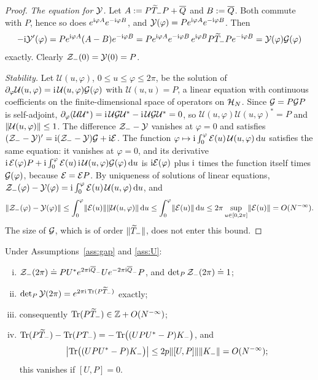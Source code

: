 \begin{proof}
\emph{The equation for $\mathcal{Y}$.} Let $A:=P\widetilde{T}_{-} P+\overline{Q}$ and $B:=\overline{Q}$. Both commute with $P$, hence so does
$e^{\mathrm{i}\varphi A}e^{-\mathrm{i}\varphi B}$, and $\mathcal{Y}(\varphi)=Pe^{\mathrm{i}\varphi A}e^{-\mathrm{i}\varphi B}$. Then
\[
-\mathrm{i}\mathcal{Y}'(\varphi)=Pe^{\mathrm{i}\varphi A}(A-B)e^{-\mathrm{i}\varphi B}=Pe^{\mathrm{i}\varphi A}e^{-\mathrm{i}\varphi B}\,e^{\mathrm{i}\varphi B}P\widetilde{T}_{-} Pe^{-\mathrm{i}\varphi B}
=\mathcal{Y}(\varphi)\mathcal{G}(\varphi)
\]
exactly. Clearly $\mathcal{Z}_{-}(0)=\mathcal{Y}(0)=P$.

\emph{Stability.} Let $\mathcal U(u,\varphi)$, $0\le u\le\varphi\le2\pi$, be the solution of
$\partial_\varphi\mathcal U(u,\varphi)=\mathrm{i}\,\mathcal U(u,\varphi)\mathcal{G}(\varphi)$ with $\mathcal U(u,u)=P$, a linear equation with continuous
coefficients on the finite-dimensional space of operators on $\mathcal{H}_N$. Since $\mathcal{G}=P\mathcal{G} P$ is self-adjoint,
$\partial_\varphi(\mathcal U\mathcal U^*)=\mathrm{i}\,\mathcal U\mathcal{G}\mathcal U^*-\mathrm{i}\,\mathcal U\mathcal{G}\mathcal U^*=0$, so $\mathcal U(u,\varphi)\mathcal U(u,\varphi)^*=P$
and $\lVert\mathcal U(u,\varphi)\rVert\le1$. The difference $\mathcal{Z}_{-}-\mathcal{Y}$ vanishes at $\varphi=0$ and satisfies
$(\mathcal{Z}_{-}-\mathcal{Y})'=\mathrm{i}(\mathcal{Z}_{-}-\mathcal{Y})\mathcal{G}+\mathrm{i}\mathcal{E}$. The function $\varphi\mapsto\mathrm{i}\int_0^\varphi\mathcal{E}(u)\,\mathcal U(u,\varphi)\,\mathrm{d} u$ satisfies the
same equation: it vanishes at $\varphi=0$, and its derivative
$\mathrm{i}\,\mathcal{E}(\varphi)P+\mathrm{i}\int_0^\varphi\mathcal{E}(u)\,\mathrm{i}\,\mathcal U(u,\varphi)\mathcal{G}(\varphi)\,\mathrm{d} u$ is $\mathrm{i}\mathcal{E}(\varphi)$ plus $\mathrm{i}$ times the
function itself times $\mathcal{G}(\varphi)$, because $\mathcal{E}=\mathcal{E} P$. By uniqueness of solutions of linear equations,
$\mathcal{Z}_{-}(\varphi)-\mathcal{Y}(\varphi)=\mathrm{i}\int_0^\varphi\mathcal{E}(u)\,\mathcal U(u,\varphi)\,\mathrm{d} u$, and
\[
\lVert\mathcal{Z}_{-}(\varphi)-\mathcal{Y}(\varphi)\rVert\le\int_0^\varphi\lVert\mathcal{E}(u)\rVert\lVert\mathcal U(u,\varphi)\rVert\,\mathrm{d} u\le\int_0^\varphi\lVert\mathcal{E}(u)\rVert\,\mathrm{d} u
\le2\pi\sup_{u\in[0,2\pi]}\lVert\mathcal{E}(u)\rVert=O(N^{-\infty}) .
\]
The size of $\mathcal{G}$, which is of order $\lVert\widetilde{T}_{-}\rVert$, does not enter this bound.
\end{proof}

\begin{lemma}\label{lem:determinant}
Under Assumptions~\ref{ass:gap} and \ref{ass:U}:
\begin{enumerate}[(i)]
\item $\mathcal{Z}_{-}(2\pi)\doteq PU^*e^{2\pi\mathrm{i}\overline{Q}_-}Ue^{-2\pi\mathrm{i}\overline{Q}_-}P$, and $\det\nolimits_{P}\mathcal{Z}_{-}(2\pi)\doteq1$;
\item $\det\nolimits_{P}\mathcal{Y}(2\pi)=e^{2\pi\mathrm{i}\operatorname{Tr}(P\widetilde{T}_{-})}$ exactly;
\item consequently $\operatorname{Tr}(P\widetilde{T}_{-})\in\mathbb{Z}+O(N^{-\infty})$;
\item $\operatorname{Tr}(P\widetilde{T}_{-})-\operatorname{Tr}(PT_-)=-\operatorname{Tr}\bigl((UPU^*-P)K_-\bigr)$, and
\[
\bigl\lvert\operatorname{Tr}\bigl((UPU^*-P)K_-\bigr)\bigr\rvert\le2p\lVert[U,P]\rVert\lVert K_-\rVert=O(N^{-\infty}) ;
\]
this vanishes if $[U,P]=0$.
\end{enumerate}
\end{lemma}

